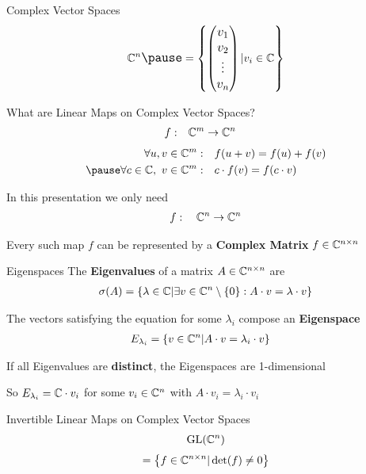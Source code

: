 \begin{frame}{Complex Vector Spaces}
    \huge
    \begin{align*}
        \C^n \large \pause
        = \left\{
            \begin{pmatrix}
                v_1 \\ v_2 \\ \vdots \\ v_n
            \end{pmatrix} | v_i \in \C
        \right\}
    \end{align*}

\end{frame}

\begin{frame}{What are Linear Maps on Complex Vector Spaces?}
    \Large
    \begin{align*}
        f: \quad & \mathbb{C}^m \to \mathbb{C}^n
    \end{align*}
    \large
    \begin{align*}
        \forall u, v \in \C^m: \quad & f(u + v) = f(u) + f(v) \\ \pause
        \forall c \in \C,\ v \in \C^m: \quad & c \cdot f(v) = f(c \cdot v)
    \end{align*}
    
    \pause
    In this presentation we only need
    \Large
    \begin{align*}
        f: \quad \mathbb{C}^n \to \mathbb{C}^n
    \end{align*}

    \large
    \pause
    Every such map $f$ can be represented by a \textbf{Complex Matrix} $f \in \mathbb{C}^{n \times n}$
    \vspace{2em}
\end{frame}

\begin{frame}{Eigenspaces}
    \large
    The \textbf{Eigenvalues} of a matrix $A \in \mathbb{C}^{n \times n}$ are
    \pause
    \begin{align*}
        \sigma(A) =
        \left\{
            \lambda \in \mathbb{C} | \exists v \in \mathbb{C}^n \setminus \{0\}: A \cdot v = \lambda \cdot v
        \right\}
    \end{align*}
    
    \pause
    The vectors satisfying the equation for some $\lambda_i$ compose an \textbf{Eigenspace}
    \pause
    \begin{align*}
        E_{\lambda_i} & = \left\{
            v \in \mathbb{C}^n | A \cdot v = \lambda_i \cdot v
        \right\}
    \end{align*}
    
    \pause
    If all Eigenvalues are \textbf{distinct}, the Eigenspaces are 1-dimensional

    \pause
    So $E_{\lambda_i} = \mathbb{C} \cdot v_i$ for some $v_i \in \mathbb{C}^n$ with $A \cdot v_i = \lambda_i \cdot v_i$ 
\end{frame}

\begin{frame}{Invertible Linear Maps on Complex Vector Spaces}
    \huge
    \begin{align*}
        \operatorname{GL}(\mathbb{C}^n)
    \end{align*}
    \pause
    \large
    \begin{align*}
        = \left\{
            f \in \mathbb{C}^{n \times n} | \det(f) \neq 0
        \right\}
    \end{align*}

\end{frame}
